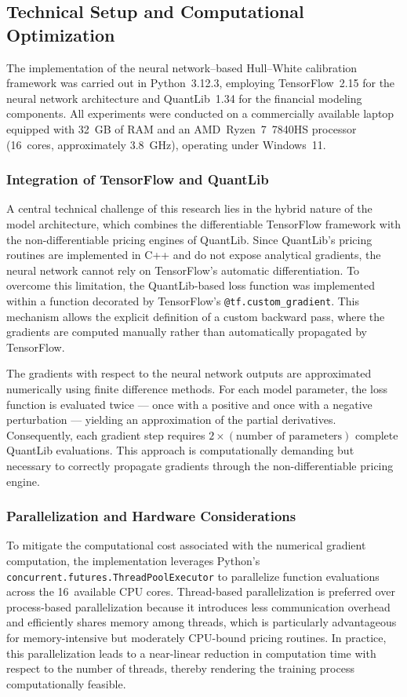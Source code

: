 {\subsection{Technical Setup and Computational Optimization}
\label{subsec:technical_setup}
The implementation of the neural network–based Hull–White calibration framework was carried out in Python~3.12.3, employing TensorFlow~2.15 for the neural network architecture and QuantLib~1.34 for the financial modeling components. All experiments were conducted on a commercially available laptop equipped with 32~GB of RAM and an AMD~Ryzen~7~7840HS processor (16~cores, approximately 3.8~GHz), operating under Windows~11.

\subsubsection{Integration of TensorFlow and QuantLib}
A central technical challenge of this research lies in the hybrid nature of the model architecture, which combines the differentiable TensorFlow framework with the non-differentiable pricing engines of QuantLib. Since QuantLib’s pricing routines are implemented in C++ and do not expose analytical gradients, the neural network cannot rely on TensorFlow’s automatic differentiation. To overcome this limitation, the QuantLib-based loss function was implemented within a function decorated by TensorFlow’s \texttt{@tf.custom\_gradient}. This mechanism allows the explicit definition of a custom backward pass, where the gradients are computed manually rather than automatically propagated by TensorFlow.

The gradients with respect to the neural network outputs are approximated numerically using finite difference methods. For each model parameter, the loss function is evaluated twice — once with a positive and once with a negative perturbation — yielding an approximation of the partial derivatives. Consequently, each gradient step requires $2 \times (\text{number of parameters})$ complete QuantLib evaluations. This approach is computationally demanding but necessary to correctly propagate gradients through the non-differentiable pricing engine.

\subsubsection{Parallelization and Hardware Considerations}
To mitigate the computational cost associated with the numerical gradient computation, the implementation leverages Python’s \texttt{concurrent.futures.ThreadPoolExecutor} to parallelize function evaluations across the 16~available CPU cores. Thread-based parallelization is preferred over process-based parallelization because it introduces less communication overhead and efficiently shares memory among threads, which is particularly advantageous for memory-intensive but moderately CPU-bound pricing routines. In practice, this parallelization leads to a near-linear reduction in computation time with respect to the number of threads, thereby rendering the training process computationally feasible.

}
